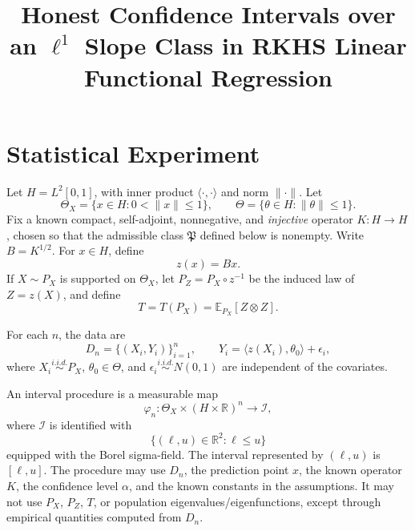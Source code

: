 \documentclass{article}
\begin{document}
\hypersetup{
  colorlinks=true,
  linkcolor=blue,
  citecolor=blue,
  urlcolor=blue
}



\title{Honest Confidence Intervals over an \(\ell^1\) Slope Class in RKHS Linear Functional Regression}
\author{}
\date{}

\newcommand{\R}{\mathbb{R}}
\newcommand{\E}{\mathbb{E}}
\newcommand{\Prb}{\mathbb{P}}
\newcommand{\Supp}{\operatorname{Supp}}
\newcommand{\leb}{\operatorname{Leb}}
\newcommand{\supp}{\mathrm{supp}}

\maketitle







\newcommand{\cP}{\mathcal P}
\newcommand{\cX}{\mathcal X}
\newcommand{\cI}{\mathcal I}
\newcommand{\Leb}{\operatorname{Leb}}





\section{Statistical Experiment}

Let \(H=L^2[0,1]\), with inner product \(\langle\cdot,\cdot\rangle\) and norm
\(\|\cdot\|\). Let
\[
  \Theta_X=\{x\in H:0<\|x\|\le 1\},
  \qquad
  \Theta=\{\theta\in H:\|\theta\|\le 1\}.
\]
Fix a known compact, self-adjoint, nonnegative, and \emph{injective}
operator \(K:H\to H\), chosen so that the admissible class
\(\mathfrak P\) defined below is nonempty. Write \(B=K^{1/2}\). For \(x\in H\), define
\[
  z(x)=Bx.
\]
If \(X\sim P_X\) is supported on \(\Theta_X\), let \(P_Z=P_X\circ z^{-1}\)
be the induced law of \(Z=z(X)\), and define
\[
  T=T(P_X)=\E_{P_X}[Z\otimes Z].
\]

For each \(n\), the data are
\[
  D_n=\{(X_i,Y_i)\}_{i=1}^n,
  \qquad
  Y_i=\langle z(X_i),\theta_0\rangle+\epsilon_i,
\]
where \(X_i\stackrel{i.i.d.}{\sim}P_X\), \(\theta_0\in\Theta\), and
\(\epsilon_i\stackrel{i.i.d.}{\sim}N(0,1)\) are independent of the covariates.

An interval procedure is a measurable map
\[
  \varphi_n:\Theta_X\times (H\times\R)^n\to\cI,
\]
where \(\cI\) is identified with
\[
  \{(\ell,u)\in\R^2:\ell\le u\}
\]
equipped with the Borel sigma-field. The interval represented by
\((\ell,u)\) is \([\ell,u]\). The procedure may use \(D_n\), the prediction
point \(x\), the known operator \(K\), the confidence level \(\alpha\), and
the known constants in the assumptions. It may not use \(P_X\), \(P_Z\),
\(T\), or population eigenvalues/eigenfunctions, except through empirical
quantities computed from \(D_n\).
\end{document}
